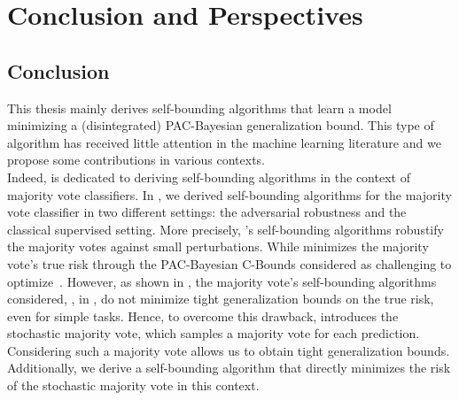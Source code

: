 \chapter*{Conclusion and Perspectives}
\label{chap:conclu}

\section*{Conclusion}

This thesis mainly derives self-bounding algorithms that learn a model minimizing a (disintegrated) PAC-Bayesian generalization bound.
This type of algorithm has received little attention in the machine learning literature and we propose some contributions in various contexts.\\

Indeed,  is dedicated to deriving self-bounding algorithms in the context of majority vote classifiers.
In , we derived self-bounding algorithms for the majority vote classifier in two different settings: the adversarial robustness and the classical supervised setting.
More precisely, 's self-bounding algorithms robustify the majority votes against small perturbations.
While  minimizes the majority vote's true risk through the PAC-Bayesian C-Bounds considered as challenging to optimize~\citep{LorenzenIgelSeldin2019,MasegosaLorenzenIgelSeldin2020}.
However, as shown in , the majority vote's self-bounding algorithms considered, \eg, in , do not minimize tight generalization bounds on the true risk, even for simple tasks.
Hence, to overcome this drawback,  introduces the stochastic majority vote, which samples a majority vote for each prediction.
Considering such a majority vote allows us to obtain tight generalization bounds.
Additionally, we derive a self-bounding algorithm that directly minimizes the risk of the stochastic majority vote in this context.

